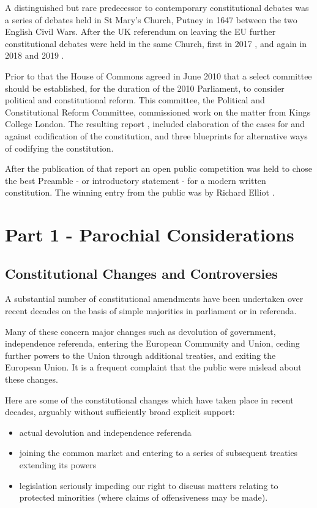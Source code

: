 \documentclass[14pt,titlepage]{extarticle}
\begin{document}
A distinguished but rare predecessor to contemporary constitutional debates was a series of debates held in St Mary’s Church, Putney in 1647 between the two English Civil Wars.
After the UK referendum on leaving the EU further constitutional debates were held in the same Church, first in 2017 \cite{rbjw001}, and again in 2018 and 2019 \cite{rbjw002}.

Prior to that the House of Commons agreed in June 2010 that a select committee should be established, for the duration of the 2010 Parliament, to consider political and constitutional reform.
This committee, the Political and Constitutional Reform Committee, commissioned work on the matter from Kings College London.
The resulting report \cite{rbjw003}, included elaboration of the cases for and against codification of the constitution, and three blueprints \cite{rbjw004} for alternative ways of codifying the constitution.

After the publication of that report an open public competition was held to chose the best Preamble - or introductory statement - for a modern written constitution.
The winning entry from the public was by Richard Elliot \cite{rbjw011}.

\section{Part 1 - Parochial Considerations}\label{part1}

\subsection{Constitutional Changes and Controversies}

A substantial number of constitutional amendments have been undertaken over recent decades on the basis of simple majorities in parliament or in referenda.

Many of these concern major changes such as devolution of government, independence referenda, entering the European Community and Union, ceding further powers to the Union through additional treaties, and exiting the European Union.
It is a frequent complaint that the public were mislead about these changes.

Here are some of the constitutional changes which have taken place in recent decades, arguably without sufficiently broad explicit support:

\begin{itemize}
\item actual devolution and independence referenda
\item joining the common market and entering to a series of subsequent treaties extending its powers
  \item legislation seriously impeding our right to discuss matters relating to protected minorities (where claims of offensiveness may be made).
  \end{itemize}
\end{document}
